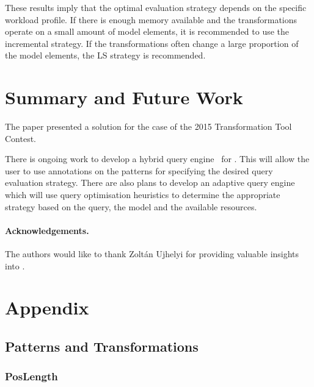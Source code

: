 \documentclass[submission,copyright,creativecommons]{eptcs}
\begin{document}
These results imply that the optimal evaluation strategy depends on the specific workload profile. If there is enough memory available and the transformations operate on a small amount of model elements, it is recommended to use the incremental strategy. If the transformations often change a large proportion of the model elements, the LS strategy is recommended.

\section{Summary and Future Work}
\label{summary}

The paper presented a solution for the \tb case of the 2015 Transformation Tool Contest. 

There is ongoing work to develop a hybrid query engine~\cite{STTT10} for \eiq. This will allow the user to use annotations on the patterns for specifying the desired query evaluation strategy. There are also plans to develop an adaptive query engine which will use query optimisation heuristics to determine the appropriate strategy based on the query, the model and the available resources.

\paragraph{Acknowledgements.} The authors would like to thank Zoltán Ujhelyi for providing valuable insights into \eiq.




\clearpage

\appendix
\section{Appendix}

\subsection{Patterns and Transformations}
\label{patterns}

\subsubsection{\textsf{PosLength}}


\end{document}
